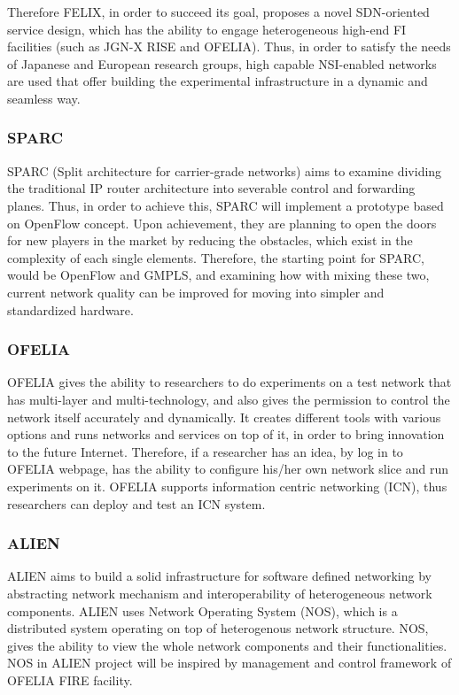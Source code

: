 Therefore FELIX, in order to succeed its goal, proposes a novel SDN-oriented service design, which has the ability to engage heterogeneous high-end FI facilities (such as JGN-X RISE and OFELIA). Thus, in order to satisfy the needs of Japanese and European research groups, high capable NSI-enabled networks are used that offer building the experimental infrastructure in a dynamic and seamless way. 

\subsubsection{SPARC}

SPARC (Split architecture for carrier-grade networks) aims to examine dividing the traditional IP router architecture into severable control and forwarding planes. Thus, in order to achieve this, SPARC will implement a prototype based on OpenFlow concept. Upon achievement, they are planning to open the doors for new players in the market by reducing the obstacles, which exist in the complexity of each single elements. Therefore, the starting point for SPARC, would be OpenFlow and GMPLS, and examining how with mixing these two, current network quality can be improved for moving into simpler and standardized hardware. \cite{SPARCproject}

\subsubsection{OFELIA}

OFELIA gives the ability to researchers to do experiments on a test network that has multi-layer and multi-technology, and also gives the permission to control the network itself accurately and dynamically. It creates different tools with various options and runs networks and services on top of it, in order to bring innovation to the future Internet. Therefore, if a researcher has an idea, by log in to OFELIA webpage, has the ability to configure his/her own network slice and run experiments on it. OFELIA supports information centric networking (ICN), thus researchers can deploy and test an ICN system. \cite{OFELIAproject}   

\subsubsection{ALIEN}

ALIEN aims to  build a solid infrastructure for software defined networking by abstracting network mechanism and interoperability of heterogeneous network components. ALIEN uses Network Operating System (NOS), which is a distributed system operating on top of heterogenous network structure. NOS, gives the ability to view the whole network components and their functionalities. NOS in ALIEN project will be inspired by management and control framework of OFELIA FIRE facility. \cite{ALIENproject}

